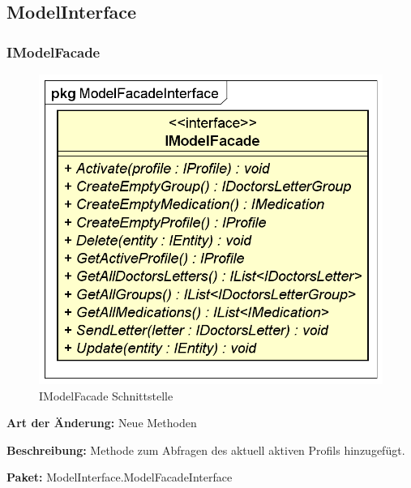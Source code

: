 \documentclass[a4paper]{scrreprt}
\begin{document}
\subsection{ModelInterface}
\subsubsection{IModelFacade}
\begin{figure}[H]
\centering
\includegraphics[width=0.75\textheight]{graphics/Klassendiagramme/Model/IModelFacade.png}
\caption{IModelFacade Schnittstelle}
\end{figure}
\textbf{Art der Änderung:} Neue Methoden

\textbf{Beschreibung:} Methode zum Abfragen des aktuell aktiven Profils hinzugefügt.

\textbf{Paket:} ModelInterface.ModelFacadeInterface
\end{document}
